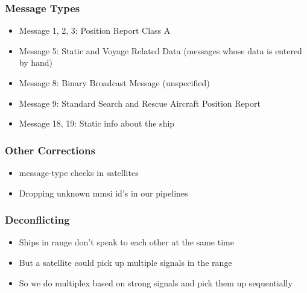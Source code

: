\documentclass[12pt]{beamer}
\begin{document}
    \begin{frame}
        \frametitle{Message Types}
            \begin{itemize}
                \item Message 1, 2, 3: Position Report Class A
                \pause
                \item Message 5: Static and Voyage Related Data (messages whose data is entered by hand)
                \pause
                \item Message 8: Binary Broadcast Message (unspecified)
                \pause
                \item Message 9: Standard Search and Rescue Aircraft Position Report
                \pause
                \item Message 18, 19: Static info about the ship
            \end{itemize}
    \end{frame}

    \begin{frame}
        \frametitle{Other Corrections}
            \begin{itemize}
                \item message-type checks in satellites
                \pause
                \item Dropping unknown mmsi id's in our pipelines
            \end{itemize}
    \end{frame}

    \begin{frame}
        \frametitle{Deconflicting}
            \begin{itemize}
                \item Ships in range don't speak to each other at the same time
                \pause
                \item But a satellite could pick up multiple signals in the range
                \pause
                \item So we do multiplex based on strong signals and pick them up sequentially
            \end{itemize}
    \end{frame}
\end{document}
